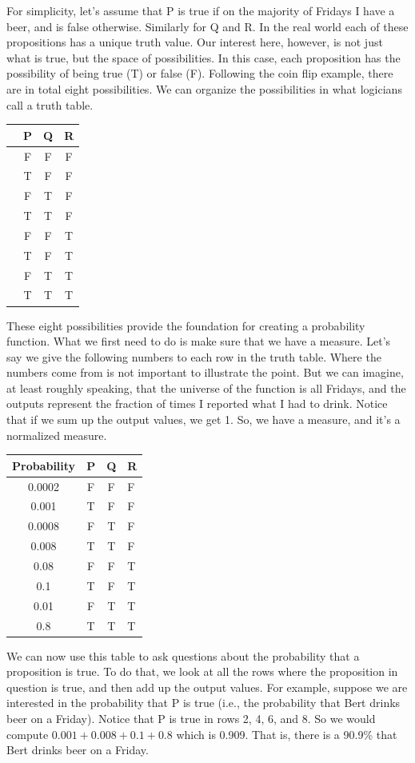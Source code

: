\documentclass[]{tufte-book}
\begin{document}
For simplicity, let's assume that P is true if on the majority of Fridays I have a beer, and is false otherwise. Similarly for Q and R. In the real world each of these propositions has a unique truth value. Our interest here, however, is not just what is true, but the space of possibilities. In this case, each proposition has the possibility of being true (T) or false (F). Following the coin flip example, there are in total eight possibilities. We can organize the possibilities in what logicians call a truth table.

\begin{longtable}[]{@{}lccc@{}}
\toprule
& P & Q & R\tabularnewline
\midrule
\endhead
& F & F & F\tabularnewline
& T & F & F\tabularnewline
& F & T & F\tabularnewline
& T & T & F\tabularnewline
& F & F & T\tabularnewline
& T & F & T\tabularnewline
& F & T & T\tabularnewline
& T & T & T\tabularnewline
\bottomrule
\end{longtable}

These eight possibilities provide the foundation for creating a probability function. What we first need to do is make sure that we have a measure. Let's say we give the following numbers to each row in the truth table. Where the numbers come from is not important to illustrate the point. But we can imagine, at least roughly speaking, that the universe of the function is all Fridays, and the outputs represent the fraction of times I reported what I had to drink. Notice that if we sum up the output values, we get 1. So, we have a measure, and it's a normalized measure.

\begin{longtable}[]{@{}cccl@{}}
\toprule
Probability & P & Q & R\tabularnewline
\midrule
\endhead
0.0002 & F & F & F\tabularnewline
0.001 & T & F & F\tabularnewline
0.0008 & F & T & F\tabularnewline
0.008 & T & T & F\tabularnewline
0.08 & F & F & T\tabularnewline
0.1 & T & F & T\tabularnewline
0.01 & F & T & T\tabularnewline
0.8 & T & T & T\tabularnewline
\bottomrule
\end{longtable}

We can now use this table to ask questions about the probability that a proposition is true. To do that, we look at all the rows where the proposition in question is true, and then add up the output values. For example, suppose we are interested in the probability that P is true (i.e., the probability that Bert drinks beer on a Friday). Notice that P is true in rows 2, 4, 6, and 8. So we would compute \(0.001+0.008+0.1+0.8\) which is 0.909. That is, there is a 90.9\% that Bert drinks beer on a Friday.
\end{document}
